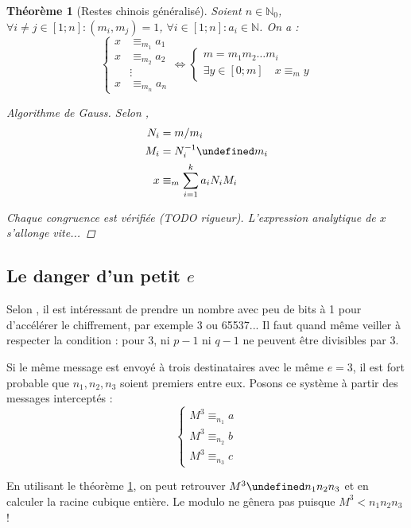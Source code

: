 \documentclass[11pt,twocolumn]{article}
\let\mod\undefined
\DeclareMathOperator{\mod}{mod}
\theoremstyle{plain}
\newtheorem{thm}{Théorème}
\newcommand{\esN}{\mathbb{N}} %
\newcommand{\dbi}{\Longleftrightarrow}
\begin{document}
\begin{thm}[Restes chinois généralisé]\label{thm:chremg}
	Soient $n \in \esN_0$,
	$\forall i\neq j \in [1;n] : (m_i,m_j)=1$,
	$\forall i \in [1;n] : a_i \in \esN$.
	On a : \[
		\left\{\begin{array}{ll}
			x &\equiv_{m_1} a_1 \\
			x &\equiv_{m_2} a_2 \\
			&\vdots \\
			x &\equiv_{m_n} a_n
		\end{array}\right.
		\dbi
		\left\{\begin{array}{l}
			m=m_1m_2\dots m_i \\
			\exists y \in [0;m] \quad x \equiv_m y
		\end{array}\right.
	\]
	\begin{proof}[Algorithme de Gauss] Selon \cite[p. 68]{hac},
		\begin{align*}
			N_i &= m/m_i \\
			M_i &= N_i^{-1} \mod m_i \\
			x &\equiv_m \sum_{i=1}^k a_iN_iM_i
		\end{align*}

		Chaque congruence est vérifiée (TODO rigueur).
		L'expression analytique de $x$ s'allonge vite...
	\end{proof}
\end{thm}

\subsection{Le danger d'un petit $e$}
Selon \cite[p. 288]{hac}, il est intéressant de prendre un nombre avec
peu de bits à 1 pour d'accélérer le chiffrement, par exemple 3 ou 65537...
Il faut quand même veiller à respecter la condition : pour 3, ni $p-1$ ni $q-1$
ne peuvent être divisibles par 3.

Si le même message est envoyé à trois destinataires avec le même $e=3$,
il est fort probable que $n_1,n_2,n_3$ soient premiers entre eux.
Posons ce système à partir des messages interceptés : \[\left\{\begin{array}{ll}
	M^3 \equiv_{n_1} a \\
	M^3 \equiv_{n_2} b \\
	M^3 \equiv_{n_3} c
\end{array}\right.\]

En utilisant le théorème \ref{thm:chremg},
on peut retrouver $M^3 \mod n_1n_2n_3$ et en calculer la racine cubique entière.
Le modulo ne gênera pas puisque $M^3<n_1n_2n_3$ !
\end{document}
